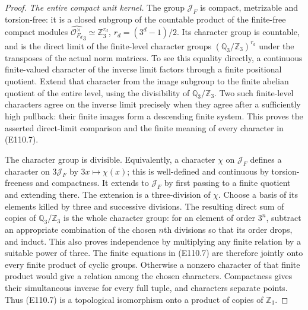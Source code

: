 \begin{proof}
\emph{The entire compact unit kernel.}
The group $\mathcal J_F$ is compact, metrizable and torsion-free:
it is a closed subgroup of the countable product of the finite-free
compact modules
$\widehat{\mathcal O_{F_d}^{\times}}_3\simeq
\mathbb Z_3^{r_d}$, $r_d=(3^d-1)/2$.
Its character group is countable, and is the direct limit
of the finite-level character groups
$(\mathbb Q_3/\mathbb Z_3)^{r_d}$ under the transposes of the
actual norm matrices. To see this equality directly, a continuous
finite-valued character of the inverse limit factors through a
finite positional quotient. Extend that character from the image
subgroup to the finite abelian quotient of the entire level,
using the divisibility of $\mathbb Q_3/\mathbb Z_3$.
Two such finite-level characters agree on the inverse limit
precisely when they agree after a sufficiently high pullback:
their finite images form a descending finite system.
This proves the asserted direct-limit comparison and the finite
meaning of every character in (E110.7).

The character group is divisible. Equivalently, a character
$\chi$ on $\mathcal J_F$ defines a character on $3\mathcal J_F$
by $3x\mapsto\chi(x)$; this is well-defined and continuous by
torsion-freeness and compactness. It extends to $\mathcal J_F$
by first passing to a finite quotient and extending there.
The extension is a three-division of $\chi$.
Choose a basis of its elements killed by three and successive
divisions. The resulting direct sum of copies of
$\mathbb Q_3/\mathbb Z_3$ is the whole character group:
for an element of order $3^n$, subtract an appropriate combination
of the chosen $n$th divisions so that its order drops, and induct.
This also proves independence by multiplying any finite relation
by a suitable power of three.
The finite equations in (E110.7) are therefore jointly onto
every finite product of cyclic groups. Otherwise a nonzero
character of that finite product would give a relation among
the chosen characters. Compactness gives their simultaneous
inverse for every full tuple, and characters separate points.
Thus (E110.7) is a topological isomorphism onto a product of
copies of $\mathbb Z_3$.


\end{proof}
